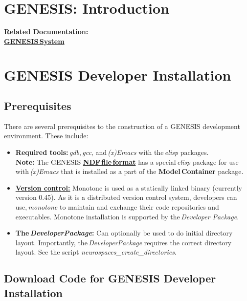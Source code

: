 \documentclass[12pt]{article}
\begin{document}
\section*{GENESIS: Introduction}

{\bf Related Documentation:} \\
\href{../genesis-system/genesis-system.tex}{\bf GENESIS\,System}

\section*{GENESIS Developer Installation}

\subsection*{Prerequisites}

There are several prerequisites to the construction of a GENESIS development environment. These include:

\begin{itemize}

\item {\bf Required tools:}\,{\it gdb},\,{\it gcc}, and\,{\it (x)Emacs} with the\,{\it elisp} packages. \\
{\bf Note:} The GENESIS \href{../ndf-file-format/ndf-file-format.tex}{\bf NDF\,file\,format} has a special\,{\it elisp} package for use with\,{\it (x)Emacs} that is installed as a part of the {\bf Model\,Container} package.
\item \href{../version-control/version-control.tex}{{\bf Version control:}} Monotone is used as a statically linked binary (currently version 0.45). As it is a distributed version control system, developers can use,\,{\it monotone} to maintain and exchange their code repositories and executables. Monotone installation is supported by the\,{\it Developer Package}. 
\item {\bf  The\,{\it DeveloperPackage}:} Can optionally be used to do initial directory layout. Importantly, the\,{\it DeveloperPackage} requires the correct directory layout. See the script {\it neurospaces\_create\_directories}.

\end{itemize}

\subsection*{Download Code for GENESIS Developer Installation}
\end{document}

